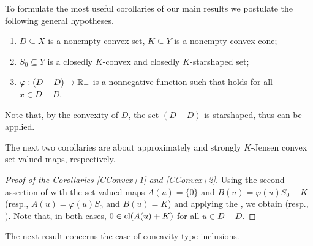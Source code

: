 To formulate the most useful corollaries of our main results we postulate the following general hypotheses.
\begin{enumerate}[(H1)]
\item $D\subseteq X$ is a nonempty convex set, $K\subseteq Y$ is a nonempty convex cone; 
\item $S_0\subseteq Y$ is a closedly $K$-convex and closedly $K$-starshaped set;
\item $\varphi:(D-D)\to\mathbb{R}_+$ is a nonnegative function such that  holds for all $x\in D-D$. 
\end{enumerate}
Note that, by the convexity of $D$, the set $(D-D)$ is starshaped, thus  can be applied. 

The next two corollaries are about approximately and strongly $K$-Jensen convex set-valued maps, respectively.



\begin{proof}[Proof of the Corollaries \ref{CConvex+1} and \ref{CConvex+2}]
Using the second assertion of  with the set-valued maps $A(u)=\{0\}$ and $B(u)=\varphi(u)S_0+K$ (resp., 
$A(u)=\varphi(u)S_0$ and $B(u)=K$) and applying the , we obtain  
(resp., ). Note that, in both cases, $0\in\mathop{\hbox{\rm cl}}\nolimits(A(u)+K)$ for all $u\in D-D$.
\end{proof}

The next result concerns the case of concavity type inclusions.

